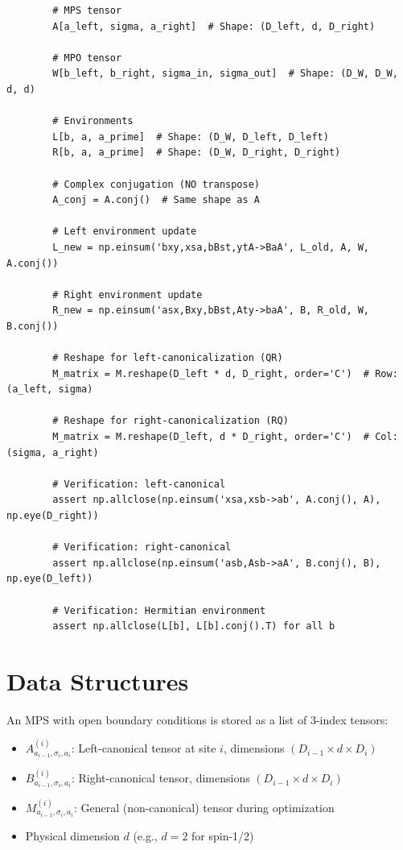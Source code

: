 \documentclass[aps,prb,onecolumn,scriptaddress]{revtex4-2}
\begin{document}
		\begin{verbatim}
		# MPS tensor
		A[a_left, sigma, a_right]  # Shape: (D_left, d, D_right)
		
		# MPO tensor
		W[b_left, b_right, sigma_in, sigma_out]  # Shape: (D_W, D_W, d, d)
		
		# Environments
		L[b, a, a_prime]  # Shape: (D_W, D_left, D_left)
		R[b, a, a_prime]  # Shape: (D_W, D_right, D_right)
		
		# Complex conjugation (NO transpose)
		A_conj = A.conj()  # Same shape as A
		
		# Left environment update
		L_new = np.einsum('bxy,xsa,bBst,ytA->BaA', L_old, A, W, A.conj())
		
		# Right environment update  
		R_new = np.einsum('asx,Bxy,bBst,Aty->baA', B, R_old, W, B.conj())
		
		# Reshape for left-canonicalization (QR)
		M_matrix = M.reshape(D_left * d, D_right, order='C')  # Row: (a_left, sigma)
		
		# Reshape for right-canonicalization (RQ)
		M_matrix = M.reshape(D_left, d * D_right, order='C')  # Col: (sigma, a_right)
		
		# Verification: left-canonical
		assert np.allclose(np.einsum('xsa,xsb->ab', A.conj(), A), np.eye(D_right))
		
		# Verification: right-canonical
		assert np.allclose(np.einsum('asb,Asb->aA', B.conj(), B), np.eye(D_left))
		
		# Verification: Hermitian environment
		assert np.allclose(L[b], L[b].conj().T) for all b
		\end{verbatim}
	
	\section{Data Structures}
	
	An MPS with open boundary conditions is stored as a list of 3-index tensors:
	\begin{itemize}
		\item $A^{(i)}_{a_{i-1},\sigma_i,a_i}$: Left-canonical tensor at site $i$, dimensions $(D_{i-1} \times d \times D_i)$
		\item $B^{(i)}_{a_{i-1},\sigma_i,a_i}$: Right-canonical tensor, dimensions $(D_{i-1} \times d \times D_i)$  
		\item $M^{(i)}_{a_{i-1},\sigma_i,a_i}$: General (non-canonical) tensor during optimization
		\item Physical dimension $d$ (e.g., $d=2$ for spin-1/2)
	\end{itemize}
	
\end{document}
